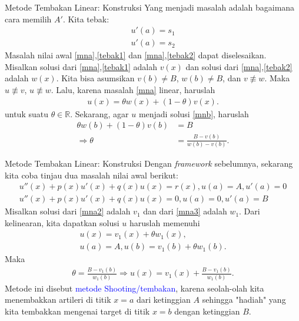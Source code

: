 \documentclass[xcolor={dvipsnames}, 9pt]{beamer}
\renewcommand{\emph}[1]{\textcolor{Blue}{#1}}
\begin{document}
    \begin{frame}{Metode Tembakan Linear: Konstruksi}
        Yang menjadi masalah adalah bagaimana cara memilih $A'$. Kita tebak:
        \begin{align}
        	u'(a) = s_1 \label{tebak1}\\
        	u'(a) = s_2 \label{tebak2}
        \end{align}
        Masalah nilai awal \eqref{mna},\eqref{tebak1} dan \eqref{mna},\eqref{tebak2} dapat diselesaikan. Misalkan solusi dari \eqref{mna},\eqref{tebak1} adalah $v(x)$ dan solusi dari \eqref{mna},\eqref{tebak2} adalah $w(x)$. Kita bisa asumsikan $v(b)\neq B$, $w(b)\neq B$, dan $v\not\equiv w$. Maka $u\not\equiv v$, $u\not\equiv w$. Lalu, karena masalah \eqref{mna} linear, haruslah
        \begin{align*}
        	u(x) = \theta w(x) + (1-\theta)v(x).
        \end{align*}
        untuk suatu $\theta\in\mathbb{R}$. \newline
        Sekarang, agar $u$ menjadi solusi \eqref{mnb}, haruslah
        \begin{align*}
        	\theta w(b) + (1-\theta)v(b) &= B \\
        	\Rightarrow \theta &= \frac{B - v(b)}{w(b)-v(b)}.
        \end{align*}
    \end{frame}
    \begin{frame}{Metode Tembakan Linear: Konstruksi}
    	Dengan \textit{framework} sebelumnya, sekarang kita coba tinjau dua masalah nilai awal berikut:
    	\begin{gather}
    		u''(x) + p(x)u'(x) + q(x)u(x) = r(x), u(a) = A, u'(a) = 0 \label{mna2}\\
    		u''(x) + p(x)u'(x) + q(x)u(x) = 0, u(a) = 0, u'(a) = B \label{mna3}
    	\end{gather}
    	Misalkan solusi dari \eqref{mna2} adalah $v_1$ dan dari \eqref{mna3} adalah $w_1$. Dari kelinearan, kita dapatkan solusi $u$ haruslah memenuhi
    	\begin{align*}
    		u(x) = v_1(x) + \theta w_1(x), \\
    		u(a) = A, u(b) = v_1(b) + \theta w_1(b).
    	\end{align*} 
		Maka
		\begin{align*}
			\theta = \frac{B - v_1(b)}{w_1(b)} \Rightarrow u(x) = v_1(x) + \frac{B - v_1(b)}{w_1(b)}.
		\end{align*}
		Metode ini disebut \emph{metode Shooting/tembakan}, karena seolah-olah kita menembakkan artileri di titik $x=a$ dari ketinggian $A$ sehingga "hadiah" yang kita tembakkan mengenai target di titik $x=b$ dengan ketinggian $B$.
    \end{frame}
\end{document}
